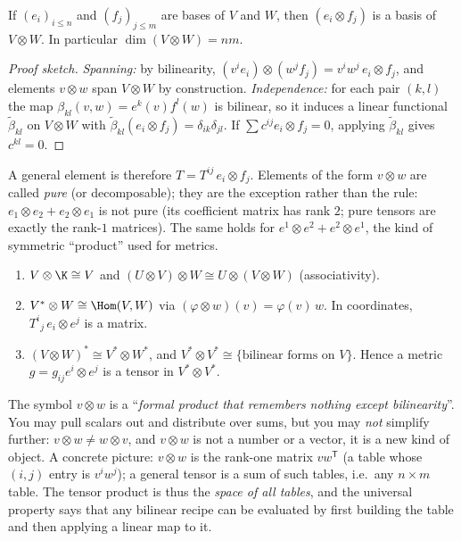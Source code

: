 \begin{theorem}\label{thm:tensorbasis}
If $(e_i)_{i\le n}$ and $(f_j)_{j\le m}$ are bases of $V$ and $W$, then $(e_i\otimes f_j)$ is a basis of $V\otimes W$.
In particular $\dim(V\otimes W)=nm$.
\end{theorem}
\begin{proof}[Proof sketch]
\emph{Spanning:} by bilinearity, $(v^ie_i)\otimes(w^jf_j)=v^iw^j\,e_i\otimes f_j$, and elements $v\otimes w$ span $V\otimes W$ by construction.
\emph{Independence:} for each pair $(k,l)$ the map $\beta_{kl}(v,w)=e^k(v)f^l(w)$ is bilinear, so it induces a linear
functional $\tilde\beta_{kl}$ on $V\otimes W$ with $\tilde\beta_{kl}(e_i\otimes f_j)=\delta_{ik}\delta_{jl}$. If $\sum c^{ij}e_i\otimes f_j=0$,
applying $\tilde\beta_{kl}$ gives $c^{kl}=0$.
\end{proof}

A general element is therefore $T=T^{ij}\,e_i\otimes f_j$. Elements of the form $v\otimes w$ are called
\emph{pure} (or decomposable); they are the exception rather than the rule: $e_1\otimes e_2+e_2\otimes e_1$ is not pure
(its coefficient matrix has rank $2$; pure tensors are exactly the rank-$1$ matrices). The same holds for
$e^{1}\otimes e^{2}+e^{2}\otimes e^{1}$, the kind of symmetric ``product'' used for metrics.

\begin{proposition}
\begin{enumerate}
  \item $V\otimes\K\cong V$ and $(U\otimes V)\otimes W\cong U\otimes(V\otimes W)$ (associativity).
  \item $V^*\otimes W\cong\Hom(V,W)$ via $(\varphi\otimes w)(v)=\varphi(v)\,w$. In coordinates, $T^{i}{}_{j}\,e_i\otimes e^j$ is a matrix.
  \item $(V\otimes W)^*\cong V^*\otimes W^*$, and $V^*\otimes V^*\cong\{\text{bilinear forms on }V\}$. Hence a metric $g=g_{ij}e^i\otimes e^j$ is a tensor in $V^*\otimes V^*$.
\end{enumerate}
\end{proposition}

\begin{intuition}
The symbol $v\otimes w$ is a ``\emph{formal product that remembers nothing except bilinearity}''. You may
pull scalars out and distribute over sums, but you may \emph{not} simplify further: $v\otimes w\neq w\otimes v$,
and $v\otimes w$ is not a number or a vector, it is a new kind of object.
A concrete picture: $v\otimes w$ is the rank-one matrix $vw^{\mathsf T}$ (a table whose $(i,j)$ entry is $v^iw^j$);
a general tensor is a sum of such tables, i.e.\ any $n\times m$ table. The tensor product is thus the
\emph{space of all tables}, and the universal property says that any bilinear recipe can be evaluated by first
building the table and then applying a linear map to it.
\end{intuition}

